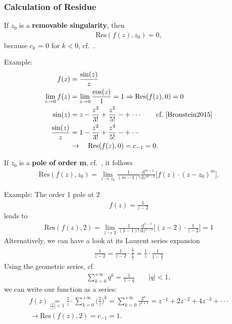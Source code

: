 \documentclass[11pt,a4paper,DIV=12]{scrartcl}
\begin{document}
\subsubsection{Calculation of Residue}
If $z_0$ is a \textbf{removable singularity}, then
\begin{align}
	\mathrm{Res}(f(z),z_0)=0,
\end{align}
because $c_k$ = 0 for $k<0$, cf.~\cite{Fritzsche2019}.

\noindent Example:
\begin{align}
	f(z) &= \frac{\sin(z)}{z} \nonumber \\
	\lim\limits_{z \rightarrow 0}f(z) &= \lim\limits_{z \rightarrow 0}\frac{\cos(z)}{1}=1 \Rightarrow \mathrm{Res}(f(z),0)=0 \nonumber \\
	\sin(z) &= z-\frac{z^3}{3!}+\frac{z^5}{5!}-+\cdot\cdot\cdot\quad \quad \textrm{cf.~\cite[Kap. 21, S. 1058]{Bronstein2015}} \nonumber \\
	\frac{\sin(z)}{z} &= 1 - \frac{z^2}{3!}+\frac{z^4}{5!}-+\cdot\cdot\cdot \nonumber \\
	&\rightarrow \quad \mathrm{Res}(f(z),0)=c_{-1} = 0. \nonumber
\end{align}

\noindent If $z_0$ is a \textbf{pole of order m}, cf.~\cite{Fritzsche2019}, it follows
\begin{align}
\label{eq:ResTheorem_pole_order_m}
	\mathrm{Res}(f(z),z_0)=\lim\limits_{z \rightarrow z_0}\frac{1}{(m-1)!}\frac{\mathrm{d}^{m-1}}{\mathrm{d} z^{m-1}}\bigg [f(z)\cdot (z-z_0)^m\bigg ].
\end{align}

\noindent Example: The order 1 pole at 2
\begin{align}
	f(z) = \frac{1}{z-2} \nonumber
\end{align}
leads to
\begin{align}
	\mathrm{Res}(f(z),2)=\lim\limits_{z\rightarrow 2}\frac{1}{(1-1)!}\frac{\mathrm{d}^{1-1}}{\mathrm{d}z^{1-1}}\bigg [(z-2)\cdot\frac{1}{z-2}\bigg ] = 1 \nonumber
\end{align}
Alternatively, we can have a look at its Laurent series expansion
\begin{align}
	\frac{1}{z-2}=\frac{1}{z-2}\cdot\frac{\frac{1}{z}}{\frac{1}{z}}=\frac{1}{z}\cdot\frac{1}{1-\frac{2}{z}} \nonumber
\end{align}
Using the geometric series, cf.~\cite[Kap. 1, S. 19]{Bronstein2015}
\begin{align}
	\sum_{k=0}^{+\infty}q^k=\frac{1}{1-q}\quad\quad|q| < 1 \nonumber,
\end{align}
we can write our function as a series:
\begin{align}
	f(z)\underset{|\frac{2}{z}|<1}{=}\frac{1}{z}\cdot\sum_{k=0}^{+\infty}\bigg (\frac{2}{z}\bigg )^k = \sum_{k=0}^{+\infty}\frac{2^k}{z^{k+1}} = z^{-1}+2z^{-2}+4z^{-3}+\cdot\cdot\cdot \nonumber \\
	\rightarrow \mathrm{Res}(f(z),2)=c_{-1}=1. \nonumber
\end{align}
\end{document}
